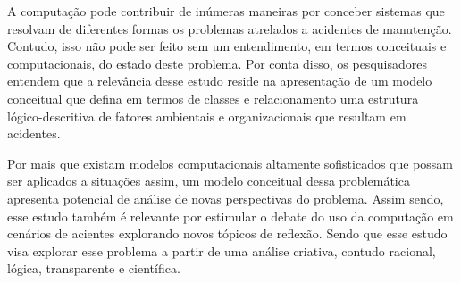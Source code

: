 A computação pode contribuir de inúmeras maneiras por conceber sistemas que resolvam de diferentes formas os problemas atrelados a acidentes de manutenção. Contudo, isso não pode ser feito sem um entendimento, em termos conceituais e computacionais, do estado deste problema. Por conta disso, os pesquisadores entendem que a relevância desse estudo reside na apresentação de um modelo conceitual que defina em termos de classes e relacionamento uma estrutura lógico-descritiva de fatores ambientais e organizacionais que resultam em acidentes. 

Por mais que existam modelos computacionais altamente sofisticados que possam ser aplicados a situações assim, um modelo conceitual dessa problemática apresenta potencial de análise de novas perspectivas do problema. Assim sendo, esse estudo também é relevante por estimular o debate do uso da computação em cenários de acientes explorando novos tópicos de reflexão. Sendo que esse estudo visa explorar esse problema a partir de uma análise criativa, contudo racional, lógica, transparente e científica. 